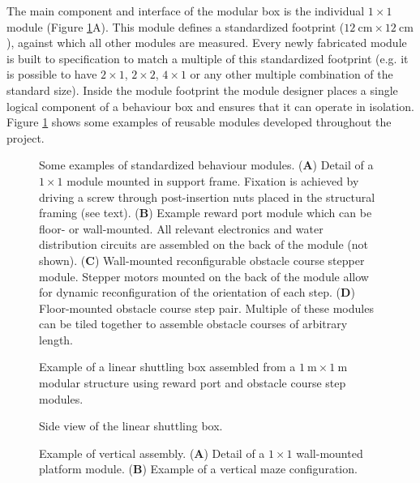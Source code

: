 The main component and interface of the modular box is the individual $1\times 1$ module (Figure \ref{fig:modules}A). This module defines a standardized footprint ($\SI{12}{\centi\meter}\times \SI{12}{\centi\meter}$), against which all other modules are measured. Every newly fabricated module is built to specification to match a multiple of this standardized footprint (e.g. it is possible to have $2\times 1$, $2\times 2$, $4\times 1$ or any other multiple combination of the standard size). Inside the module footprint the module designer places a single logical component of a behaviour box and ensures that it can operate in isolation. Figure \ref{fig:modules} shows some examples of reusable modules developed throughout the project.

\begin{figure}
\centering

\caption{Some examples of standardized behaviour modules. (\textbf{A}) Detail of a $1\times 1$ module mounted in support frame. Fixation is achieved by driving a screw through post-insertion nuts placed in the structural framing (see text). (\textbf{B}) Example reward port module which can be floor- or wall-mounted. All relevant electronics and water distribution circuits are assembled on the back of the module (not shown). (\textbf{C}) Wall-mounted reconfigurable obstacle course stepper module. Stepper motors mounted on the back of the module allow for dynamic reconfiguration of the orientation of each step. (\textbf{D}) Floor-mounted obstacle course step pair. Multiple of these modules can be tiled together to assemble obstacle courses of arbitrary length.}
\label{fig:modules}
\end{figure}

\begin{figure}
\centering

\caption{Example of a linear shuttling box assembled from a $\SI{1}{\meter}\times \SI{1}{\meter}$ modular structure using reward port and obstacle course step modules.}
\label{fig:box}
\end{figure}

\begin{figure}
\centering

\caption{Side view of the linear shuttling box.}
\label{fig:box3d}
\end{figure}

\begin{figure}
\centering

\caption{Example of vertical assembly. (\textbf{A}) Detail of a $1\times 1$ wall-mounted platform module. (\textbf{B}) Example of a vertical maze configuration.}
\label{fig:verticalBox}
\end{figure}

